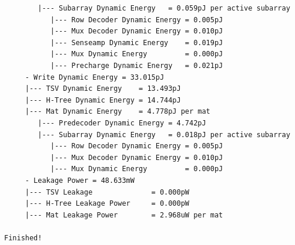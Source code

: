 \documentclass[11pt]{article}
\begin{document}
\begin{verbatim}
        |--- Subarray Dynamic Energy   = 0.059pJ per active subarray
           |--- Row Decoder Dynamic Energy = 0.005pJ
           |--- Mux Decoder Dynamic Energy = 0.010pJ
           |--- Senseamp Dynamic Energy    = 0.019pJ
           |--- Mux Dynamic Energy         = 0.000pJ
           |--- Precharge Dynamic Energy   = 0.021pJ
     - Write Dynamic Energy = 33.015pJ
     |--- TSV Dynamic Energy    = 13.493pJ
     |--- H-Tree Dynamic Energy = 14.744pJ
     |--- Mat Dynamic Energy    = 4.778pJ per mat
        |--- Predecoder Dynamic Energy = 4.742pJ
        |--- Subarray Dynamic Energy   = 0.018pJ per active subarray
           |--- Row Decoder Dynamic Energy = 0.005pJ
           |--- Mux Decoder Dynamic Energy = 0.010pJ
           |--- Mux Dynamic Energy         = 0.000pJ
     - Leakage Power = 48.633mW
     |--- TSV Leakage              = 0.000pW
     |--- H-Tree Leakage Power     = 0.000pW
     |--- Mat Leakage Power        = 2.968uW per mat

Finished!

\end{verbatim}
\end{document}
